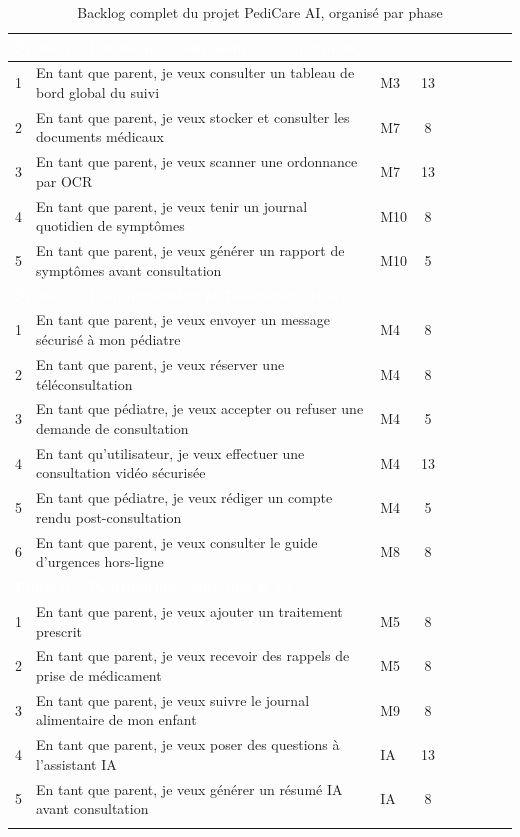 \documentclass[11pt,a4paper]{article}
\begin{document}
\begin{longtable}{|c|p{5.5cm}|p{2cm}|c|c|c|c|c|c|}
\multicolumn{9}{|l|}{\cellcolor{phasebg}\textcolor{white}{\textbf{Phase 3 -- Dashboard, Documents \& Symptômes}}} \\
\hline
1 & En tant que parent, je veux consulter un tableau de bord global du suivi & M3 & 13 & & & & & \\
\hline
2 & En tant que parent, je veux stocker et consulter les documents médicaux & M7 & 8 & & & & & \\
\hline
3 & En tant que parent, je veux scanner une ordonnance par OCR & M7 & 13 & & & & & \\
\hline
4 & En tant que parent, je veux tenir un journal quotidien de symptômes & M10 & 8 & & & & & \\
\hline
5 & En tant que parent, je veux générer un rapport de symptômes avant consultation & M10 & 5 & & & & & \\
\hline

\multicolumn{9}{|l|}{\cellcolor{phasebg}\textcolor{white}{\textbf{Phase 4 -- Communication \& Téléconsultation}}} \\
\hline
1 & En tant que parent, je veux envoyer un message sécurisé à mon pédiatre & M4 & 8 & & & & & \\
\hline
2 & En tant que parent, je veux réserver une téléconsultation & M4 & 8 & & & & & \\
\hline
3 & En tant que pédiatre, je veux accepter ou refuser une demande de consultation & M4 & 5 & & & & & \\
\hline
4 & En tant qu'utilisateur, je veux effectuer une consultation vidéo sécurisée & M4 & 13 & & & & & \\
\hline
5 & En tant que pédiatre, je veux rédiger un compte rendu post-consultation & M4 & 5 & & & & & \\
\hline
6 & En tant que parent, je veux consulter le guide d'urgences hors-ligne & M8 & 8 & & & & & \\
\hline

\multicolumn{9}{|l|}{\cellcolor{phasebg}\textcolor{white}{\textbf{Phase 5 -- PediPharma, Nutrition \& IA}}} \\
\hline
1 & En tant que parent, je veux ajouter un traitement prescrit & M5 & 8 & & & & & \\
\hline
2 & En tant que parent, je veux recevoir des rappels de prise de médicament & M5 & 8 & & & & & \\
\hline
3 & En tant que parent, je veux suivre le journal alimentaire de mon enfant & M9 & 8 & & & & & \\
\hline
4 & En tant que parent, je veux poser des questions à l'assistant IA & IA & 13 & & & & & \\
\hline
5 & En tant que parent, je veux générer un résumé IA avant consultation & IA & 8 & & & & & \\
\hline

\caption{Backlog complet du projet PediCare AI, organisé par phase}
\end{longtable}
\end{document}
